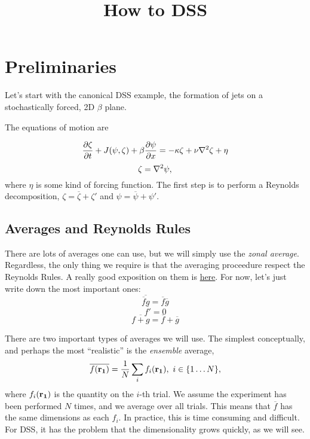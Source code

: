 \documentclass{paper}
\title{How to DSS}
\newcommand*{\mean}[1]{\overline{#1}}
\newcommand{\rr}[1]{\vb{r_{#1}}}
\begin{document}
\maketitle

\section{Preliminaries}
\label{sec:preliminaries}

Let's start with the canonical DSS example, the formation of jets on a stochastically forced, 2D $\beta$ plane.

The equations of motion are

\begin{equation}
  \label{eq:zeta_eom}
  \pdv{\zeta}{t} + J(\psi, \zeta) + \beta \pdv{\psi}{x} = -\kappa \zeta + \nu \laplacian{\zeta} + \eta
\end{equation}
%
\begin{equation}
  \label{eq:zeta_def}
  \zeta = \laplacian{\psi},
\end{equation}
where $\eta$ is some kind of forcing function. The first step is to perform a Reynolds decomposition, $\zeta = \mean{\zeta} + \zeta'$ and $\psi = \mean{\psi} + \psi'$.

\subsection{Averages and Reynolds Rules}
\label{sec:averages}

There are lots of averages one can use, but we will simply use the \emph{zonal average}. Regardless, the only thing we require is that the averaging proceedure respect the Reynolds Rules. A really good exposition on them is \href{https://kiwi.atmos.colostate.edu/group/dave/pdf/Reynolds_Averaging.pdf}{here}. For now, let's just write down the most important ones:
\begin{equation}
  \label{eq:reyn_1}
  \mean{\mean{f} g} = \mean{f}\mean{g}
\end{equation}
\begin{equation}
  \label{eq:reyn_2}
  \mean{f'} = 0
\end{equation}
\begin{equation}
  \label{eq:reyn_3}
  \mean{f + g} = \mean{f} + \mean{g}
\end{equation}

There are two important types of averages we will use. The simplest conceptually, and perhaps the most ``realistic'' is the \emph{ensemble} average,
\begin{equation}
  \label{eq:ensemble_average}
  \mean{f(\rr1)} = \frac{1}{N} \sum_i f_i(\rr1),\  i \in \{1 \ldots N\},
\end{equation}
where $f_i(\rr1)$ is the quantity on the $i$-th trial. We assume the experiment has been performed $N$ times, and we average over all trials. This means that $\mean{f}$ has the same dimensions as each $f_i$. In practice, this is time consuming and difficult. For DSS, it has the problem that the dimensionality grows quickly, as we will see.
\end{document}
